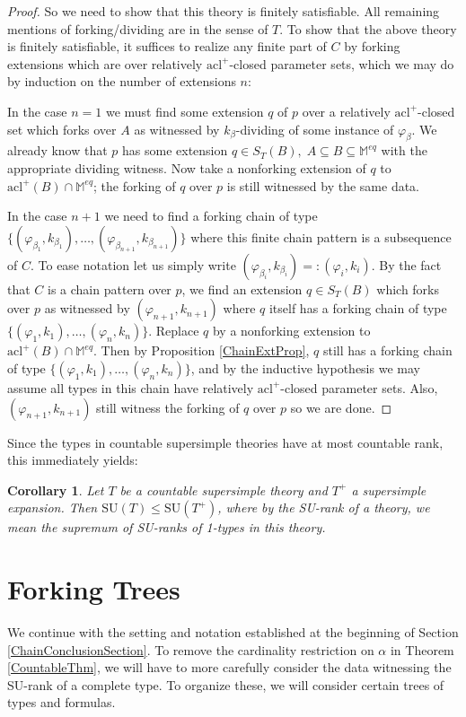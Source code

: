 \documentclass{article}
\newtheorem{cor}[theorem]{Corollary}
\theoremstyle{remark}
\theoremstyle{definition}
\begin{document}
\begin{proof}
    So we need to show that this theory is finitely satisfiable. All remaining mentions of forking/dividing are in the sense of $T$. To show that the above theory is finitely satisfiable, it suffices to realize any finite part of $C$ by forking extensions which are over relatively $\mathrm{acl}^+$-closed parameter sets, which we may do by induction on the number of extensions $n$:

    In the case $n=1$ we must find some extension $q$ of $p$ over a relatively $\mathrm{acl}^+$-closed set which forks over $A$ as witnessed by $k_\beta$-dividing of some instance of $\varphi_\beta$. We already know that $p$ has some extension $q\in S_T(B),\; A\subseteq B\subseteq \mathbb{M}^{eq}$ with the appropriate dividing witness. Now take a nonforking extension of $q$ to $\mathrm{acl}^+(B)\cap \mathbb{M}^{eq}$; the forking of $q$ over $p$ is still witnessed by the same data.

    In the case $n+1$ we need to find a forking chain of type $\{(\varphi_{\beta_1},k_{\beta_1}),\dots,(\varphi_{\beta_{n+1}},k_{\beta_{n+1}})\}$ where this finite chain pattern is a subsequence of $C$. To ease notation let us simply write $(\varphi_{\beta_i},k_{\beta_i})=:(\varphi_i,k_i)$. By the fact that $C$ is a chain pattern over $p$, we find an extension $q\in S_T(B)$ which forks over $p$ as witnessed by $(\varphi_{n+1},k_{n+1})$ where $q$ itself has a forking chain of type $\{(\varphi_1,k_1),\dots,(\varphi_n,k_n)\}$. Replace $q$ by a nonforking extension to $\mathrm{acl}^+(B)\cap\mathbb{M}^{eq}$. Then by Proposition \ref{ChainExtProp}, $q$ still has a forking chain of type $\{(\varphi_1,k_1),\dots,(\varphi_n,k_n)\}$, and by the inductive hypothesis we may assume all types in this chain have relatively $\mathrm{acl}^+$-closed parameter sets. Also, $(\varphi_{n+1},k_{n+1})$ still witness the forking of $q$ over $p$ so we are done.
\end{proof}

Since the types in countable supersimple theories have at most countable rank, this immediately yields:
\begin{cor}
    Let $T$ be a countable supersimple theory and $T^+$ a supersimple expansion. Then $\mathrm{SU}(T)\leq\mathrm{SU}(T^+)$, where by the SU-rank of a theory, we mean the supremum of SU-ranks of 1-types in this theory.
\end{cor}

\section{Forking Trees}\label{Trees}
We continue with the setting and notation established at the beginning of Section \ref{ChainConclusionSection}. To remove the cardinality restriction on $\alpha$ in Theorem \ref{CountableThm}, we will have to more carefully consider the data witnessing the SU-rank of a complete type. To organize these, we will consider certain trees of types and formulas.
\end{document}
